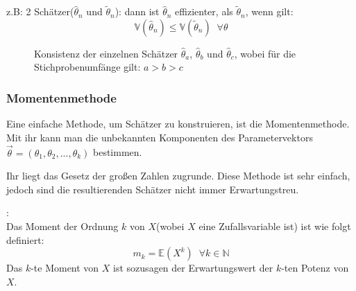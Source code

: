 \begin{definition}
\begin{enumerate}[i)]
            z.B: 2 Schätzer($\hat\theta_n$ und $\tilde\theta_n$): dann ist $\hat\theta_n$ effizienter, als $\tilde\theta_n$, wenn gilt:
            \[\mathbb{V}(\hat\theta_n)\leq\mathbb{V}(\tilde\theta_n)\;\;\forall\theta\]
        
    \end{enumerate}
\end{definition}
\begin{figure}
    \centering
    \begin{tikzpicture}
        
    \end{tikzpicture}
    \caption{Konsistenz der einzelnen Schätzer $\hat\theta_a$, $\hat\theta_b$ und $\hat\theta_c$, wobei für die Stichprobenumfänge gilt: $a>b>c$}
    \label{fig:konsistenz}
\end{figure}


\subsubsection{Momentenmethode}
Eine einfache Methode, um Schätzer zu konstruieren, ist die Momentenmethode. Mit ihr kann man die unbekannten Komponenten des Parametervektors $\vec\theta=(\theta_1,\theta_2,...,\theta_k)$ bestimmen.

Ihr liegt das Gesetz der großen Zahlen zugrunde. Diese Methode ist sehr einfach, jedoch sind die resultierenden Schätzer nicht immer Erwartungstreu. \\

\begin{definition}[Moment]:\label{def:moment}\\
    Das Moment der Ordnung $k$ von $X$(wobei $X$ eine Zufallsvariable ist) ist wie folgt definiert:
    \[m_k=\mathbb{E}(X^k)\;\;\forall k\in\mathbb{N}\]
    Das $k$-te Moment von $X$ ist sozusagen der Erwartungswert der $k$-ten Potenz von $X$.
\end{definition}

